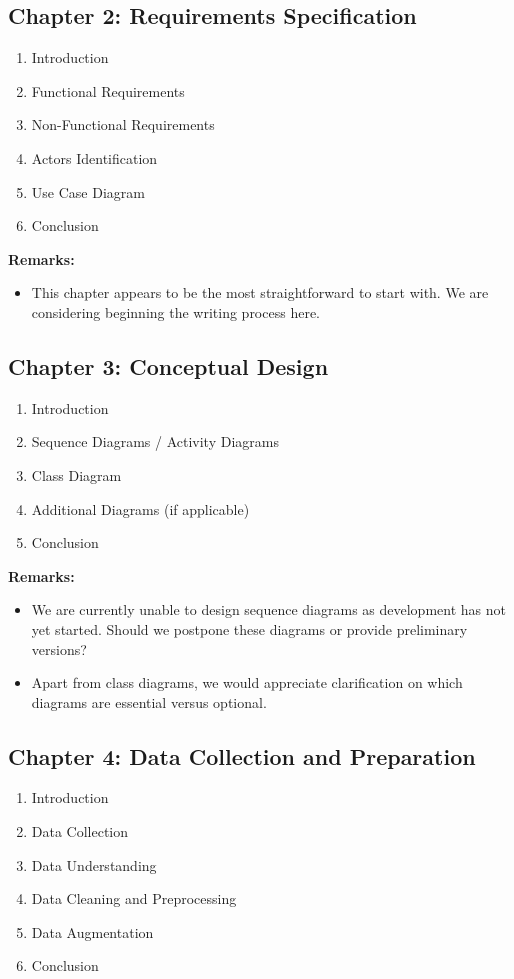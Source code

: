 \documentclass[12pt]{article}
\begin{document}
\subsection*{Chapter 2: Requirements Specification}
\begin{enumerate}[label=\arabic*.]
    \item Introduction
    \item Functional Requirements
    \item Non-Functional Requirements
    \item Actors Identification
    \item Use Case Diagram
    \item Conclusion
\end{enumerate}

\textbf{Remarks:}
\begin{itemize}
    \item This chapter appears to be the most straightforward to start with. We are considering beginning the writing process here.
\end{itemize}

\subsection*{Chapter 3: Conceptual Design}
\begin{enumerate}[label=\arabic*.]
    \item Introduction
    \item Sequence Diagrams / Activity Diagrams
    \item Class Diagram
    \item Additional Diagrams (if applicable)
    \item Conclusion
\end{enumerate}

\textbf{Remarks:}
\begin{itemize}
    \item We are currently unable to design sequence diagrams as development has not yet started. Should we postpone these diagrams or provide preliminary versions?
    \item Apart from class diagrams, we would appreciate clarification on which diagrams are essential versus optional.
\end{itemize}

\subsection*{Chapter 4: Data Collection and Preparation}
\begin{enumerate}[label=\arabic*.]
    \item Introduction
    \item Data Collection
    \item Data Understanding
    \item Data Cleaning and Preprocessing
    \item Data Augmentation
    \item Conclusion
\end{enumerate}
\end{document}
